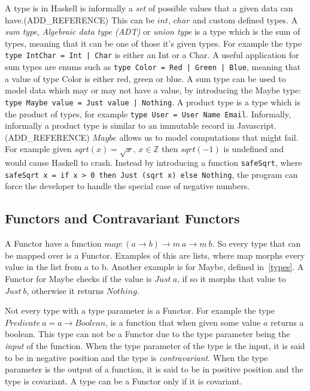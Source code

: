 A type is in Haskell is informally a \textit{set} of possible values that a
given data can have.(ADD\_REFERENCE) This can be $int$, $char$ and custom
defined types. A \textit{sum type}, \textit{Algebraic data type (ADT)} or
\textit{union type} is a type which is the sum of types, meaning that it can be
one of those it's given types. For example the type \texttt{type IntChar = Int |
Char} is either an Int or a Char. A useful application for sum types are enums
such as \texttt{type Color = Red | Green | Blue}, meaning that a value of type
Color is either red, green or blue. A sum type can be used to model data which
may or may not have a value, by introducing the Maybe type: \texttt{type Maybe
value = Just value | Nothing}. A product type is a type which is the product of
types, for example \texttt{type User = User Name Email}.  Informally, informally
a product type is similar to an immutable record in Javascript. (ADD\_REFERENCE)
$Maybe$ allows us to model computations that might fail. For example given
$sqrt(x) = \sqrt{x},\, x\in \mathbb{Z}$ then $sqrt(-1)$ is undefined and would
cause Haskell to crash.  Instead by introducing a function \texttt{safeSqrt},
where \texttt{safeSqrt x = if x > 0 then Just (sqrt x) else Nothing}, the
program can force the developer to handle the special case of negative numbers. 

\subsection{Functors and Contravariant Functors}

A Functor have a function $map : (a\rightarrow b) \rightarrow m\ a \rightarrow
m\ b$. So every type that can be mapped over is a Functor.  Examples of this are
lists, where map morphs every value in the list from a to b. Another example is
for Maybe, defined in~\ref{types}. A Functor for Maybe checks if the value is
$Just\ a$, if so it morphs that value to $Just\ b$, otherwise it returns
$Nothing$. 

Not every type with a type parameter is a Functor. For example the type
$Predicate\ a = a \rightarrow Boolean$, is a function that when given some value
$a$ returns a boolean. This type can not be a Functor due to the type parameter
being the \textit{input} of the function. When the type parameter of the type is
the input, it is said to be in negative position and the type is
\textit{contravariant}.  When the type parameter is the output of a function, it
is said to be in positive position and the type is covariant. A type can be a
Functor only if it is covariant.


